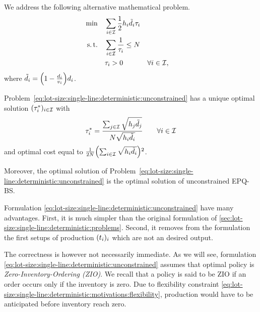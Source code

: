 We address the following alternative mathematical problem.
\begin{subequations}\label{eq:lot-size:single-line:deterministic:unconstrained}
  \begin{align}
  \min\quad & \displaystyle\sum_{i\in\mathcal{I}} \frac{1}{2}h_i\tilde{d}_i\tau_i
  \label{eq:lot-size:single-line:deterministic:unconstrained:objective}
  \\
  \operatorname{s.t.}\quad  & \displaystyle\sum_{i\in\mathcal{I}} \frac{1}{\tau_i} \le N
  \label{eq:lot-size:single-line:deterministic:unconstrained:flexibility}
  \\
       & \tau_i > 0 && \forall i\in\mathcal{I},
  \label{eq:lot-size:single-line:deterministic:unconstrained:positivity}
  \end{align}
\end{subequations}
where $\tilde{\demand}_i=\bracket{1-\frac{\demand_i}{\rate_i}}\demand_i$.

\begin{thm}\label{thm:lot-size:single-line:deterministic:unconstrained:optimality}
Problem~\eqref{eq:lot-size:single-line:deterministic:unconstrained} has a unique optimal solution $(\tau_i^*)_{i\in\mathcal{I}}$ with
\begin{equation}
  \tau_i^*= \frac{\sum_{j\in\mathcal{I}}\sqrt{h_j\tilde{d}_j}}{N\sqrt{h_i\tilde{d}_i}}\qquad\forall i\in\mathcal{I}
\end{equation}
and optimal cost equal to $\frac{1}{2\nbsetups}\bracket{\sum_{i\in\REF}\sqrt{\holding_i\tilde{\demand_i}}}^2$.

Moreover, the optimal solution of Problem~\eqref{eq:lot-size:single-line:deterministic:unconstrained} is the optimal solution of unconstrained EPQ-BS.
\end{thm}


Formulation \eqref{eq:lot-size:single-line:deterministic:unconstrained} have many advantages.
First, it is much simpler than the original formulation of \cref{sec:lot-size:single-line:deterministic:problems}.
Second, it removes from the formulation the first setups of production $\bracket{t_i}_i$ which are not an desired output.


The correctness is however not necessarily immediate.
As we will see, formulation \eqref{eq:lot-size:single-line:deterministic:unconstrained} assumes that optimal policy is \emph{Zero-Inventory-Ordering (ZIO)}.
We recall that a policy is said to be ZIO if an order occurs only if the inventory is zero.
Due to flexibility constraint \eqref{eq:lot-size:single-line:deterministic:motivations:flexibility}, production would have to be anticipated before inventory reach zero.

